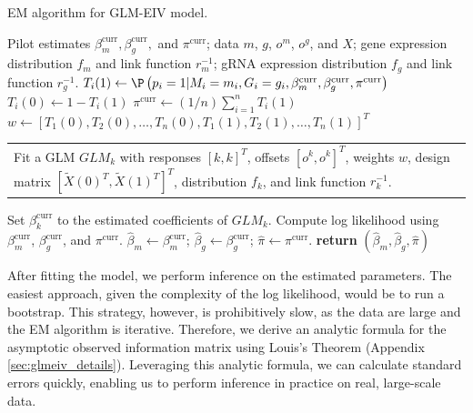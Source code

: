 \documentclass[11pt]{article}
\makeatletter
\newcommand{\multiline}[1]{%
	\begin{tabularx}{\dimexpr\linewidth-\ALG@thistlm}[t]{@{}X@{}}
		#1
	\end{tabularx}
}
\makeatother
\begin{document}
\begin{algorithm}
	\caption{EM algorithm for GLM-EIV model.}\label{algo:em_full}
	\begin{algorithmic}
		\Require Pilot estimates $\beta^\textrm{curr}_m, \beta^\textrm{curr}_g,$ and $\pi^\textrm{curr}$; data $m$, $g$, $o^m$, $o^g$, and $X$; gene expression distribution $f_m$ and link function $r^{-1}_m$; gRNA expression distribution $f_g$ and link function $r^{-1}_g$.  
			 
			\State $T_i(1) \gets \P\left(p_i = 1 |M_i = m_i, G_i = g_i, \beta_m^\textrm{curr}, \beta_g^\textrm{curr}, \pi^\textrm{curr} \right)$
			\State $T_i(0) \gets 1 - T_i(1)$
		 \EndFor
		 \State $\pi^{\textrm{curr}} \gets (1/n) \sum_{i=1}^n T_i(1)$ 
		 \State $w \gets [T_1(0), T_2(0), \dots, T_n(0), T_1(1), T_2(1), \dots, T_n(1)]^T$
		 \State  \multiline{ 
		 	Fit a GLM $GLM_k$ with responses $[k,k]^T$, offsets $[o^k, o^k]^T$, weights $w$, design matrix $[\tilde{X}(0)^T, \tilde{X}(1)^T]^T$, distribution $f_k$, and link function $r^{-1}_k$.
		}
		 \State Set $\beta_k^\textrm{curr}$ to the estimated coefficients of $GLM_k$.
		 \EndFor
		\State Compute log likelihood using $\beta_m^\textrm{curr}$, $\beta_g^\textrm{curr}$, and $\pi^\textrm{curr}$.
		\EndWhile
		\State $\hat{\beta}_m \gets \beta_m^\textrm{curr}$; $\hat{\beta}_g \gets \beta_g^\textrm{curr}$; $\hat{\pi} \gets \pi^\textrm{curr}$.
		\State \textbf{return} $(\hat{\beta}_m, \hat{\beta}_g, \hat{\pi})$
	\end{algorithmic}
\end{algorithm}

After fitting the model, we perform inference on the estimated parameters. The easiest approach, given the complexity of the log likelihood, would be to run a bootstrap. This strategy, however, is prohibitively slow, as the data are large and the EM algorithm is iterative. Therefore, we derive an analytic formula for the asymptotic observed information matrix using Louis's Theorem \cite{Louis1982} (Appendix \ref{sec:glmeiv_details}). Leveraging this analytic formula, we can calculate standard errors quickly, enabling us to perform inference in practice on real, large-scale data.
\end{document}

